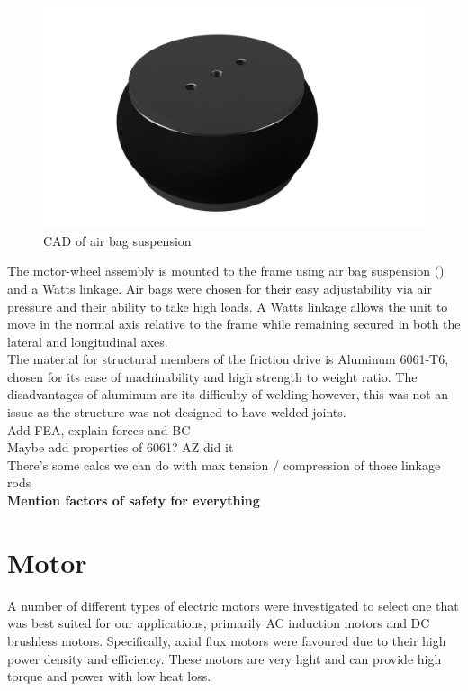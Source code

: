 \documentclass[main.tex]{subfiles}
\begin{document}
\begin{figure}[H]
\includegraphics[width=\textwidth]{images/fig3}
\caption{CAD of air bag suspension}\label{fig:cad-air-bag}
\end{figure}

    The motor-wheel assembly is mounted to the frame using air bag suspension () and a Watts linkage. Air bags were chosen for their easy adjustability via air pressure and their ability to take high loads.  A Watts linkage allows the unit to move in the normal axis relative to the frame while remaining secured in both the lateral and longitudinal axes.\\

    The material for structural members of the friction drive is Aluminum 6061-T6, chosen for its ease of machinability and high strength to weight ratio. The disadvantages of aluminum are its difficulty of welding however, this was not an issue as the structure was not designed to have welded joints.\\

    Add FEA, explain forces and BC\\
    Maybe add properties of 6061? AZ did it\\
    There’s some calcs we can do with max tension / compression of those linkage rods\\

   \textbf{ Mention factors of safety for everything}

    \section{Motor}
    A number of different types of electric motors were investigated to select one that was best suited for our applications, primarily AC induction motors and DC brushless motors. Specifically, axial flux motors were favoured due to their high power density and efficiency. These motors are very light and can provide high torque and power with low heat loss.\\
\end{document}

